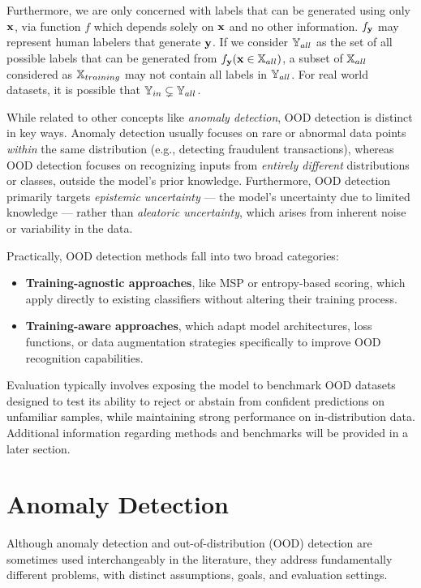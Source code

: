 \documentclass[11pt, oneside]{book}
\theoremstyle{plain}
\theoremstyle{definition}
\theoremstyle{remark}
\begin{document}
Furthermore, we are only concerned with labels that can be generated using only ${\mathbf{x}}$, via function $f$ which depends solely on ${\mathbf{x}}$ and no other information. $f_{\mathbf{y}}$ may represent human labelers that generate ${\mathbf{y}}$. If we consider ${\mathbb{Y}}_{all}$ as the set of all possible labels that can be generated from $f_{\mathbf{y}}({\mathbf{x}} \in {\mathbb{X}}_{all})$, a subset of ${\mathbb{X}}_{all}$ considered as ${\mathbb{X}}_{training}$ may not contain all labels in ${\mathbb{Y}}_{all}$. For real world datasets, it is possible that ${\mathbb{Y}}_{in} \subsetneq {\mathbb{Y}}_{all}$.



While related to other concepts like \textit{anomaly detection}, OOD detection is distinct in key ways. Anomaly detection usually focuses on rare or abnormal data points \textit{within} the same distribution (e.g., detecting fraudulent transactions), whereas OOD detection focuses on recognizing inputs from \textit{entirely different} distributions or classes, outside the model’s prior knowledge. Furthermore, OOD detection primarily targets \textit{epistemic uncertainty} — the model’s uncertainty due to limited knowledge — rather than \textit{aleatoric uncertainty}, which arises from inherent noise or variability in the data.

Practically, OOD detection methods fall into two broad categories:
\begin{itemize}
    \item \textbf{Training-agnostic approaches}, like MSP or entropy-based scoring, which apply directly to existing classifiers without altering their training process.
    \item \textbf{Training-aware approaches}, which adapt model architectures, loss functions, or data augmentation strategies specifically to improve OOD recognition capabilities.
\end{itemize}

Evaluation typically involves exposing the model to benchmark OOD datasets designed to test its ability to reject or abstain from confident predictions on unfamiliar samples, while maintaining strong performance on in-distribution data. Additional information regarding methods and benchmarks will be provided in a later section. 


\section{Anomaly Detection}

Although anomaly detection and out-of-distribution (OOD) detection are sometimes used interchangeably in the literature, they address fundamentally different problems, with distinct assumptions, goals, and evaluation settings.
\end{document}
